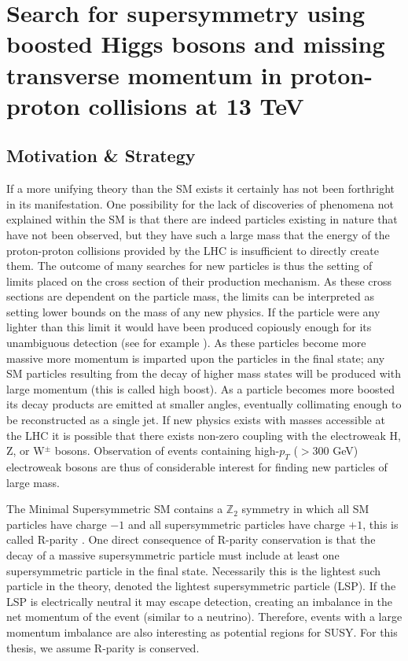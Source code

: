 \chapter{Search for supersymmetry using boosted Higgs bosons and missing transverse momentum in proton-proton collisions at 13 TeV}
\label{chap:analysis}

\section{Motivation \& Strategy}
\label{sec:mot}

If a more unifying theory than the SM exists it certainly has not been forthright in its manifestation. One possibility for the lack of discoveries of phenomena not explained within the SM is that there are indeed particles existing in nature that have not been observed, but they have such a large mass that the energy of the proton-proton collisions provided by the LHC is insufficient to directly create them. The outcome of many searches for new particles is thus the setting of limits placed on the cross section of their production mechanism. As these cross sections are dependent on the particle mass, the limits can be interpreted as setting lower bounds on the mass of any new physics. If the particle were any lighter than this limit it would have been produced copiously enough for its unambiguous detection (see for example \cite{CMS-SUS-16-033, CMS-SUS-15-002}). As these particles become more massive more momentum is imparted upon the particles in the final state; any SM particles resulting from the decay of higher mass states will be produced with large momentum (this is called high boost). As a particle becomes more boosted its decay products are emitted at smaller angles, eventually collimating enough to be reconstructed as a single jet. If new physics exists with masses accessible at the LHC it is possible that there exists non-zero coupling with the electroweak H, Z, or W$^{\pm}$ bosons. Observation of events containing high-$p_{T}$ ($>$300 GeV) electroweak bosons are thus of considerable interest for finding new particles of large mass.

The Minimal Supersymmetric SM contains a $\mathbb{Z}_{2}$ symmetry in which all SM particles have charge ${-}1$ and all supersymmetric particles have charge ${+}1$, this is called R-parity \cite{susyprimer}. One direct consequence of R-parity conservation is that the decay of a massive supersymmetric particle must include at least one supersymmetric particle in the final state. Necessarily this is the lightest such particle in the theory, denoted the lightest supersymmetric particle (LSP). If the LSP is electrically neutral it may escape detection, creating an imbalance in the net momentum of the event (similar to a neutrino). Therefore, events with a large momentum imbalance are also interesting as potential regions for SUSY. For this thesis, we assume R-parity is conserved.

